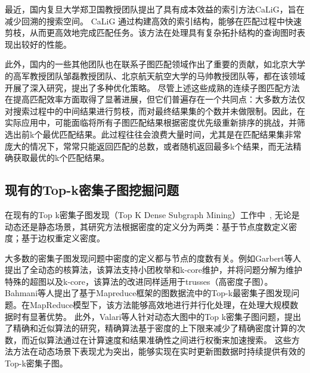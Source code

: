 最近，国内复旦大学郑卫国教授团队提出了具有成本效益的索引方法CaLiG\cite{csm-calig-DBLP:journals/pacmmod/YangZZY23}，旨在减少回溯的搜索空间。
CaLiG 通过构建高效的索引结构，能够在匹配过程中快速剪枝，从而更高效地完成匹配任务。该方法在处理具有复杂拓扑结构的查询图时表现出较好的性能。

此外，国内的一些其他团队也在联系子图匹配领域作出了重要的贡献，如北京大学的高军教授团队邹磊教授团队、北京航天航空大学的马帅教授团队等，都在该领域开展了深入研究，提出了多种优化策略。
尽管上述这些成熟的连续子图匹配方法在提高匹配效率方面取得了显著进展，但它们普遍存在一个共同点：大多数方法仅对搜索过程中的中间结果进行剪枝，而对最终结果集的个数并未做限制。因此，在实际应用中，可能面临将所有子图匹配结果根据密度优先级重新排序的挑战，并筛选出前k个最优匹配结果。此过程往往会浪费大量时间，尤其是在匹配结果集非常庞大的情况下，常常只能返回匹配的总数，或者随机返回最多k个结果，而无法精确获取最优的k个匹配结果。
\subsection{现有的Top-k密集子图挖掘问题}
在现有的Top k密集子图发现（Top K Dense Subgraph Mining）工作中~\cite{dsm-noweight-Bahmani-DBLP:journals/pvldb/BahmaniKV12,dsm-noweight-Balalau-DBLP:conf/wsdm/BalalauBCGS15,dsm-noweight-Bonchi-DBLP:journals/corr/abs-2007-01533,dsm-noweight-Dondi-DBLP:journals/corr/abs-2002-07695,dsm-noweight-Fang-DBLP:journals/pvldb/FangYCLL19,dsm-noweight-Gabert-DBLP:conf/wsdm/GabertPC21,dsm-noweight-Hu-DBLP:conf/cikm/HuWC17,dsm-noweight-Ma-DBLP:journals/pvldb/MaCLH22,dsm-noweight-Mathieu-DBLP:journals/corr/abs-2010-07794,dsm-noweight-McGregor-DBLP:journals/corr/McGregorTVV15,dsm-noweight-Rozenshtein-DBLP:journals/tkdd/RozenshteinTG17,dsm-noweight-Saha-DBLP:journals/corr/abs-2212-08820,dsm-noweight-Tsourakakis-DBLP:conf/kdd/TsourakakisBGGT13,dsm-noweight-Valari-DBLP:conf/ssdbm/ValariKP12,dsm-noweight-Zhao-DBLP:conf/icalip/ZhaoQYB14,dsm-weight-Angel-DBLP:journals/vldb/AngelKSSST14,dsm-weight-Ma-DBLP:conf/icde/MaHWLH17,dsm-weight-Muhammad-DBLP:conf/cikm/NasirGMG17},
无论是动态还是静态场景，其研究方法根据密度的定义分为两类：基于节点度数定义密度；基于边权重定义密度。

大多数的密集子图发现问题中密度的定义都与节点的度数有关。例如Garbert等人\cite{dsm-noweight-Gabert-DBLP:conf/wsdm/GabertPC21}提出了全动态的核算法，该算法支持小团枚举和k-core维护，并将问题分解为维护特殊的超图以及k-core，该算法的改进同样适用于trusses（高密度子图）。Bahmani等人\cite{dsm-noweight-Bahmani-DBLP:journals/pvldb/BahmaniKV12}提出了基于Mapreduce框架的图数据流中的Top-k最密集子图发现问题。在MapReduce模型\cite{csm-mapreduce-DBLP:journals/cacm/DeanG08}下，该方法能够高效地进行并行化处理，在处理大规模数据时有显著优势。
此外，Valari等人\cite{dsm-noweight-Valari-DBLP:conf/ssdbm/ValariKP12}针对动态大图中的Top k密集子图问题，提出了精确和近似算法的研究，精确算法基于密度的上下限来减少了精确密度计算的次数，而近似算法通过在计算速度和结果准确性之间进行权衡来加速搜索。
这些方法方法在动态场景下表现尤为突出，能够实现在实时更新图数据时持续提供有效的Top-k密集子图。

